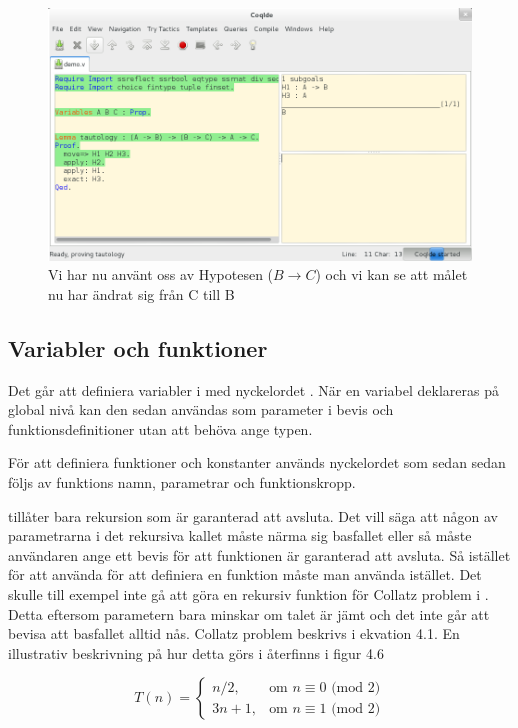 \begin{figure}[H]
  \centering
  \includegraphics[width=150mm]{images/Proof_part3}
  \caption[Bevis i \coq Ide]
   {Vi har nu använt oss av Hypotesen ($B \rightarrow C$) och vi
    kan se att målet nu har ändrat sig från C till B}
\end{figure}


\subsection{Variabler och funktioner}

Det går att definiera variabler i \coq med nyckelordet . När en
variabel deklareras på global nivå kan den sedan användas som parameter i bevis
och funktionsdefinitioner utan att behöva ange typen.

För att definiera funktioner och konstanter används nyckelordet
 som sedan sedan följs av funktions namn, parametrar och
funktionskropp.

\coq tillåter bara rekursion som är garanterad att avsluta. Det vill säga att
någon av parametrarna i det rekursiva kallet måste närma sig basfallet eller så
måste användaren ange ett bevis för att funktionen är garanterad att avsluta.
Så istället för att använda  för att definiera en funktion måste
man använda  istället. Det skulle till exempel inte gå att göra en
rekursiv funktion för Collatz problem i \coq.
Detta eftersom parametern bara
minskar om talet är jämt och det inte går att bevisa att basfallet alltid nås.
Collatz problem beskrivs i ekvation 4.1. En illustrativ beskrivning på hur detta
görs i återfinns i figur 4.6

\begin{equation}
T(n) = \left\{\begin{matrix} n/2, & \mbox{om }n\equiv0\mbox{ (mod 2)} \\ 3n+1,
                         & \mbox{om }n\equiv1\mbox{ (mod 2)} \end{matrix}\right.
\end{equation}





